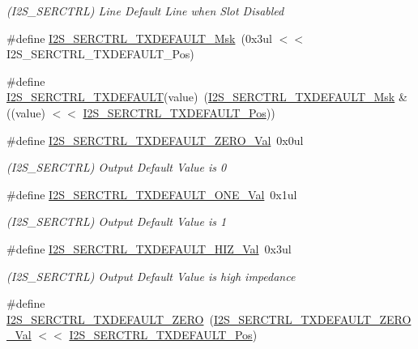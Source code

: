\begin{DoxyCompactItemize}
\begin{DoxyCompactList}\small\item\em (I2\+S\+\_\+\+S\+E\+R\+C\+T\+RL) Line Default Line when Slot Disabled \end{DoxyCompactList}\item 
\#define \mbox{\hyperlink{group___s_a_m_d21___i2_s_gada88de8ec38cd91601d936db17ef0df8}{I2\+S\+\_\+\+S\+E\+R\+C\+T\+R\+L\+\_\+\+T\+X\+D\+E\+F\+A\+U\+L\+T\+\_\+\+Msk}}~(0x3ul $<$$<$ I2\+S\+\_\+\+S\+E\+R\+C\+T\+R\+L\+\_\+\+T\+X\+D\+E\+F\+A\+U\+L\+T\+\_\+\+Pos)
\item 
\#define \mbox{\hyperlink{group___s_a_m_d21___i2_s_gacecb58f43aa03ec56cda7cf9eae73953}{I2\+S\+\_\+\+S\+E\+R\+C\+T\+R\+L\+\_\+\+T\+X\+D\+E\+F\+A\+U\+LT}}(value)~(\mbox{\hyperlink{group___s_a_m_d21___i2_s_gada88de8ec38cd91601d936db17ef0df8}{I2\+S\+\_\+\+S\+E\+R\+C\+T\+R\+L\+\_\+\+T\+X\+D\+E\+F\+A\+U\+L\+T\+\_\+\+Msk}} \& ((value) $<$$<$ \mbox{\hyperlink{group___s_a_m_d21___i2_s_ga130c73c3e105e4cb4bb20af74d674744}{I2\+S\+\_\+\+S\+E\+R\+C\+T\+R\+L\+\_\+\+T\+X\+D\+E\+F\+A\+U\+L\+T\+\_\+\+Pos}}))
\item 
\#define \mbox{\hyperlink{group___s_a_m_d21___i2_s_ga266d9d1b1d2e4b2508bafef1120311f0}{I2\+S\+\_\+\+S\+E\+R\+C\+T\+R\+L\+\_\+\+T\+X\+D\+E\+F\+A\+U\+L\+T\+\_\+\+Z\+E\+R\+O\+\_\+\+Val}}~0x0ul
\begin{DoxyCompactList}\small\item\em (I2\+S\+\_\+\+S\+E\+R\+C\+T\+RL) Output Default Value is 0 \end{DoxyCompactList}\item 
\#define \mbox{\hyperlink{group___s_a_m_d21___i2_s_ga230d651cfe50e6f24d7be3e32bc340f3}{I2\+S\+\_\+\+S\+E\+R\+C\+T\+R\+L\+\_\+\+T\+X\+D\+E\+F\+A\+U\+L\+T\+\_\+\+O\+N\+E\+\_\+\+Val}}~0x1ul
\begin{DoxyCompactList}\small\item\em (I2\+S\+\_\+\+S\+E\+R\+C\+T\+RL) Output Default Value is 1 \end{DoxyCompactList}\item 
\#define \mbox{\hyperlink{group___s_a_m_d21___i2_s_ga21059df3e2ed42310905e39bbc753aa8}{I2\+S\+\_\+\+S\+E\+R\+C\+T\+R\+L\+\_\+\+T\+X\+D\+E\+F\+A\+U\+L\+T\+\_\+\+H\+I\+Z\+\_\+\+Val}}~0x3ul
\begin{DoxyCompactList}\small\item\em (I2\+S\+\_\+\+S\+E\+R\+C\+T\+RL) Output Default Value is high impedance \end{DoxyCompactList}\item 
\#define \mbox{\hyperlink{group___s_a_m_d21___i2_s_ga8119018d8e91c5bbc5f06e8b99b98ed3}{I2\+S\+\_\+\+S\+E\+R\+C\+T\+R\+L\+\_\+\+T\+X\+D\+E\+F\+A\+U\+L\+T\+\_\+\+Z\+E\+RO}}~(\mbox{\hyperlink{group___s_a_m_d21___i2_s_ga266d9d1b1d2e4b2508bafef1120311f0}{I2\+S\+\_\+\+S\+E\+R\+C\+T\+R\+L\+\_\+\+T\+X\+D\+E\+F\+A\+U\+L\+T\+\_\+\+Z\+E\+R\+O\+\_\+\+Val}} $<$$<$ \mbox{\hyperlink{group___s_a_m_d21___i2_s_ga130c73c3e105e4cb4bb20af74d674744}{I2\+S\+\_\+\+S\+E\+R\+C\+T\+R\+L\+\_\+\+T\+X\+D\+E\+F\+A\+U\+L\+T\+\_\+\+Pos}})
$$
\end{DoxyCompactItemize}
